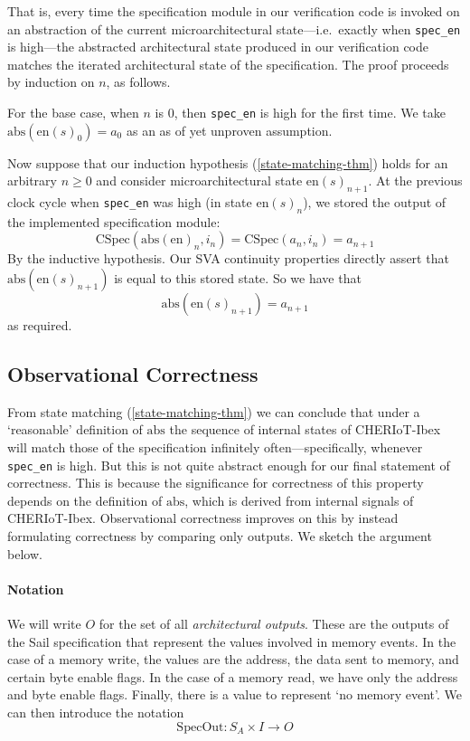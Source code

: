 \documentclass[10pt,conference]{IEEEtran}
\begin{document}
\noindent That is, every time the specification module in our verification
code is invoked on an abstraction of the current microarchitectural
state---i.e.\ exactly when \verb|spec_en| is high---the abstracted architectural
state produced in our verification code matches the iterated architectural state
of the specification. The proof proceeds by induction on $n$, as follows.

For the base case, when $n$ is $0$, then \verb|spec_en| is high for the
first time. We take $\mathrm{abs}(\mathrm{en}(s)_0) = a_0$ as an as of yet
unproven assumption.

Now suppose that our induction hypothesis (\ref{state-matching-thm}) holds
for an arbitrary $n \geq 0$ and consider microarchitectural state
$\mathrm{en}(s)_{n{+}1}$.  At the previous clock cycle when
\verb|spec_en| was high (in state $\mathrm{en}(s)_{n}$), we stored the output
of the implemented specification module:
\[
\mathrm{CSpec}(\mathrm{abs}(\mathrm{en})_{n}, i_n) = \mathrm{CSpec}(a_{n}, i_n) = a_{n{+}1}
\]
By the inductive hypothesis. Our SVA continuity properties directly assert that
$\mathrm{abs}(\mathrm{en}(s)_{n{+}1})$ is equal to this stored state. So we
have that  
\[
\mathrm{abs}(\mathrm{en}(s)_{n{+}1}) = a_{n{+}1}
\]
\noindent as required.

\subsection{Observational Correctness}

From state matching (\ref{state-matching-thm}) we can conclude that under a
`reasonable' definition of $\mathrm{abs}$ the sequence of internal states
of CHERIoT-Ibex will match those of the specification infinitely
often---specifically, whenever \verb|spec_en| is high.  But this is not
quite abstract enough for our final statement of correctness. This is
because the significance for correctness of this property depends on the
definition of $\mathrm{abs}$, which is derived from internal signals of
CHERIoT-Ibex. Observational correctness improves on this by instead
formulating correctness by comparing only outputs. We sketch the argument
below.

\paragraph{Notation}

We will write $O$ for the set of all \textit{architectural outputs}. These
are the outputs of the Sail specification that represent the values
involved in memory events. In the case of a memory write, the values are
the address, the data sent to memory, and certain byte enable flags. In
the case of a memory read, we have only the address and byte enable
flags. Finally, there is a value to represent `no memory event'. We 
can then introduce the notation
\[
\mathrm{SpecOut} : S_A \times I \to O
\]
\end{document}
